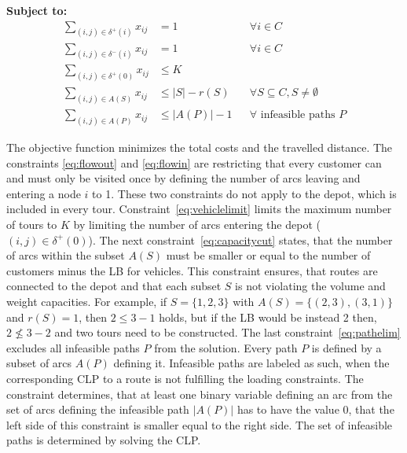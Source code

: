 \textbf{Subject to:}
\begin{align}
    \sum_{(i,j)\in \delta^+(i)} x_{ij} & = 1                                                                                  &  & \forall i \in C                         \label{eq:flowout}     \\
    \sum_{(i,j)\in \delta^-(i)} x_{ij} & = 1                                                                                  &  & \forall i \in C                         \label{eq:flowin}      \\
    \sum_{(i,j)\in \delta^+(0)} x_{ij} & \leq K                                                       \label{eq:vehiclelimit}                                                                     \\
    \sum_{(i,j)\in A(S)} x_{ij}        & \leq |S| - r(S)                                                                      &  & \forall S \subseteq C, S \neq \emptyset \label{eq:capacitycut} \\
    \sum_{(i,j)\in A(P)} x_{ij}        & \leq |A(P)| - 1                                                                      &  & \forall \text{ infeasible paths } P     \label{eq:pathelim}
\end{align}

The objective function minimizes the total costs and the travelled distance. The constraints \ref{eq:flowout} and \ref{eq:flowin}
are restricting that every customer can and must only be visited once by defining the number
of arcs leaving and entering a node $i$ to 1. These two constraints do not apply to the depot,
which is included in every tour. Constraint~\ref{eq:vehiclelimit} limits the maximum number of
tours to $K$ by limiting the number of arcs entering the depot ($(i,j)\in \delta^+(0)$).
The next constraint~\ref{eq:capacitycut} states, that the number of arcs within the subset $A(S)$
must be smaller or equal to the number of customers minus the \gls{LB} for vehicles. This constraint
ensures, that routes are connected to the depot and that each subset $S$ is not violating
the volume and weight capacities. For example, if $S=\{1,2,3\}$ with $A(S)=\{(2,3),(3,1)\}$
and $r(S) = 1$, then $2 \leq 3 - 1$ holds, but if the \gls{LB} would be instead 2 then, $2 \not\leq 3 - 2$
and two tours need to be constructed. The last constraint~\ref{eq:pathelim} excludes all infeasible paths
$P$ from the solution. Every path $P$ is defined by a subset of arcs $A(P)$ defining it. Infeasible
paths are labeled as such, when the corresponding \gls{CLP} to a route is not fulfilling the loading
constraints. The constraint determines, that at least one binary variable defining an arc
from the set of arcs defining the infeasible path $|A(P)|$ has to have the value 0, that the left
side of this constraint is smaller equal to the right side. The set of infeasible paths is determined by
solving the \gls{CLP}.




